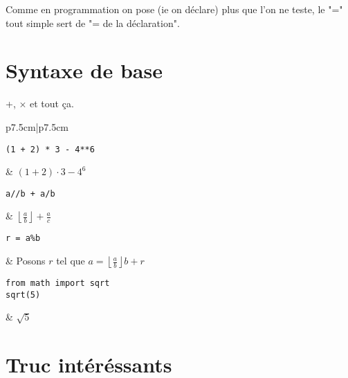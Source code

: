 \documentclass{article}
\begin{document}
Comme en programmation on pose (ie on déclare) plus que l'on ne teste, le "=" tout simple sert de "= de la déclaration".

\section{Syntaxe de base}
+, $\times$ et tout ça.
\begin{table}[h]
	\centering
	\begin{tabular}{p{7.5cm}|p{7.5cm}}
\begin{minipage}{0.5\linewidth}
\begin{verbatim}
(1 + 2) * 3 - 4**6
\end{verbatim}
\end{minipage}
       & $(1+2)\cdot 3 - 4^6$ \\
\begin{minipage}{0.5\linewidth}
\begin{verbatim}
a//b + a/b
\end{verbatim} 
\end{minipage} & $\displaystyle \left\lfloor \frac{a}{b} \right\rfloor + \frac{a}{c}$ \\

\begin{minipage}{0.5\linewidth}
\begin{verbatim}
r = a%b
\end{verbatim}
\end{minipage}
       & Posons $r$ tel que $a = \left\lfloor \frac{a}{b} \right\rfloor b + r$ \\
\hline
\begin{minipage}{0.5\linewidth}
\begin{verbatim}
from math import sqrt 
sqrt(5) 
\end{verbatim}
\end{minipage}
       & $ \sqrt{5}  $ \\
\end{tabular}
\end{table}

\section{Truc intéréssants}
\end{document}

